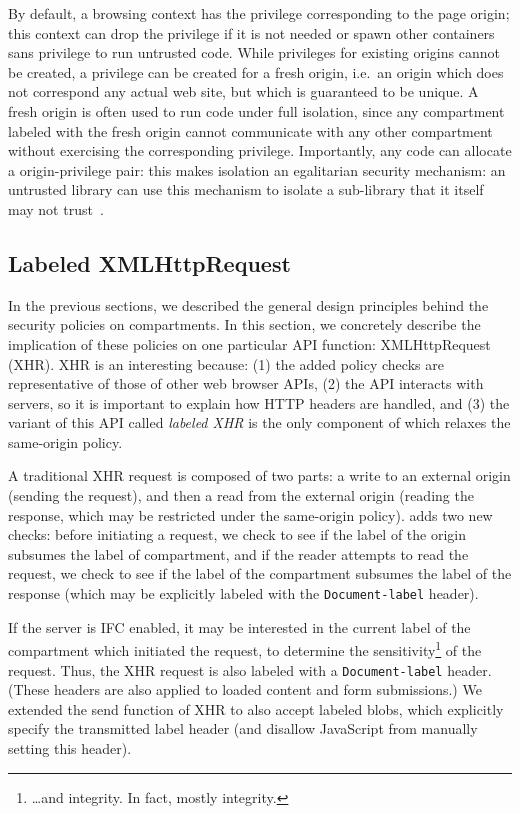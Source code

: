 By default, a browsing context has the privilege corresponding to the
page origin; this context can drop the privilege if it is not
needed or spawn other containers sans privilege to run untrusted code.
%
While privileges for existing origins cannot be created, a privilege can
be created for a fresh origin, i.e.\ an origin which does not correspond
any actual web site, but which is guaranteed to be unique.
%
A fresh origin is often used to run code under full isolation, since any
compartment labeled with the fresh origin cannot communicate with any
other compartment without exercising the corresponding privilege.
%
Importantly, any code can allocate a origin-privilege pair: this
makes isolation an egalitarian security mechanism: an untrusted library
can use this mechanism to isolate a sub-library that it itself
may not trust~\cite{Zeldovich:2006}.

\subsection{Labeled XMLHttpRequest}
\label{sec:labeled-xhr}

In the previous sections, we described the general design principles
behind the security policies on compartments.
%
In this section, we concretely describe the implication of these
policies on one particular API function: XMLHttpRequest (XHR).
%
XHR is an interesting because: (1) the added \sys{} policy checks are
representative of those of other web browser APIs, (2) the API
interacts with servers, so it is important to explain how HTTP headers are
handled, and (3) the variant of this API called \emph{labeled XHR} is
the only component of \sys{} which relaxes the same-origin policy.

A traditional XHR request is composed of two parts: a write to an
external origin (sending the request), and then a read from the external
origin (reading the response, which may be restricted under the
same-origin policy).
%
\sys{} adds two new checks: before initiating a
request, we check to see if the label of the origin subsumes the label
of compartment, and if the reader attempts to read the request, we check
to see if the label of the compartment subsumes the label of the response
(which may be explicitly labeled with the {\tt Document-label} header).

If the server is IFC enabled, it may be interested in the current label
of the compartment which initiated the request, to determine the
sensitivity\footnote{\ldots and integrity. In fact, mostly integrity.} of the request.
%
Thus, the XHR request is also labeled with a {\tt Document-label} header.
%
(These headers are also applied to loaded content and form submissions.)
%
We extended the send function of XHR to also accept labeled blobs,
which explicitly specify the transmitted label header (and disallow
JavaScript from manually setting this header).

